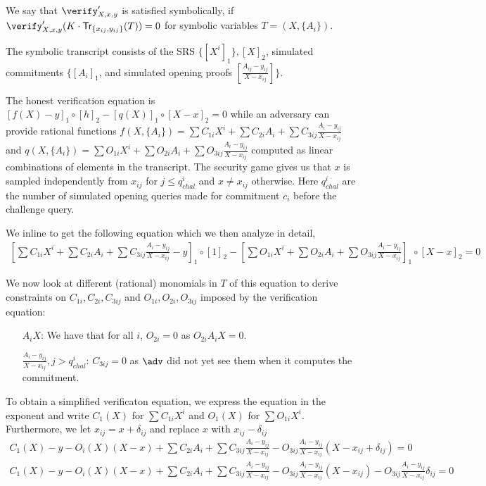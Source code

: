 \documentclass[runningheads,11pt]{llncs}
\begin{document}
We say that $\verify'_{{X,x,y}}$ is satisfied symbolically, if $\verify'_{{X,x,y}}(K \cdot \mathsf{Tr}_{\{x_{ij},y_{ij}\}} (T)) = 0$ for symbolic variables $T=(X, \{A_{i}\})$.

The symbolic transcript consists of the SRS $\{[X^{i}]_{1}\}, [X]_{2}$, simulated commitments $\{[A_{i}]_{1}$, and simulated opening proofs $ [\frac{A_{ij}-y_{{ij}}}{X-x_{ij}}]\}$.

The honest verification equation is
$[f(X) - y]_1 \circ [h]_{2} - [q(X)]_1 \circ [X-x]_{2}=0$ while an adversary can
provide rational functions
$f(X, \{A_{i}\}) = \sum C_{1i} X^{i} + \sum C_{2i} A_{i} + \sum C_{3ij}
\frac{A_{i}-y_{ij}}{X-x_{ij}}$ and
$q(X, \{A_{i}\}) = \sum O_{1i} X^{i} + \sum O_{2i} A_{i} + \sum O_{3ij}
\frac{A_{i}- y_{ij}}{X-x_{ij}}$ computed as linear combinations of elements in the
transcript.
The security game gives us that $x$ is sampled independently from $x_{ij}$ for $j\leq q^{i}_{chal}$ and $x \neq x_{ij}$ otherwise. Here $q^{i}_{chal}$ are the number of simulated opening queries made for commitment $c_{i}$ before the challenge query.

We inline to get the following equation which we then analyze in detail,
\begin{align*}
  \left[\sum C_{1i} X^{i} + \sum C_{2i} A_{i} + \sum C_{3ij} \frac{A_{i}-y_{ij}}{X-x_{ij}} - y\right]_{1} \!\!\!\circ\! [1]_{2} - \left[\sum O_{1i} X^{i} + \sum O_{2i} A_{i} + \sum O_{3ij} \frac{A_{i}-y_{ij}}{X-x_{ij}}\right]_{1} \!\!\!\circ\! [X-x]_{2} = 0
  \end{align*}

We now look at different (rational) monomials in $T$ of this equation to derive constraints on $C_{1i}, C_{{2i}},C_{{3ij}}$ and $O_{1i},O_{2i},O_{3ij}$ imposed by the verification equation:
\begin{itemize}
  \item[$A_{i}X$:] We have that for all $i$, $O_{2i}=0$ as $O_{2i} A_{i} X = 0$.
  \item[$\frac{A_{i}-y_{ij}}{X-x_{ij}}, j>q^{i}_{chal}$:] $C_{3ij}=0$ as $\adv$ did not yet see them when it computes the commitment.
\end{itemize}

To obtain a simplified verificaton equation, we express the equation in the exponent and write $C_{1}(X)$ for $\sum C_{1i} X^{i}$ and  $O_{1}(X)$ for $\sum O_{1i} X^{i}$.
Furthermore, we let $x_{ij}= x+\delta_{ij}$ and replace $x$ with $x_{ij}-\delta_{ij}$
\begin{align*}
C_{1}(X) - y - O_{i}(X)(X-x) + \sum C_{2i} A_{i} + \sum C_{3ij} \frac{A_{i}-y_{ij}}{X-x_{ij}} - O_{3ij} \frac{A_{i}-y_{ij}}{X-x_{ij}} (X-x_{ij}+\delta_{ij}) = 0\\
C_{1}(X) - y - O_{i}(X)(X-x) + \sum C_{2i} A_{i} + \sum C_{3ij} \frac{A_{i}-y_{ij}}{X-x_{ij}} - O_{3ij} \frac{A_{i}-y_{ij}}{X-x_{ij}} (X-x_{ij}) - O_{3ij} \frac{A_{i}-y_{ij}}{X-x_{ij}} \delta_{ij} = 0
       \end{align*}
\end{document}
